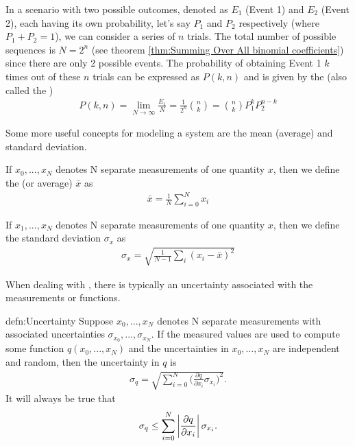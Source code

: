 In a scenario with two possible outcomes, denoted as $E_1$ (Event 1) and $E_2$ (Event 2), each having its own probability, let's say $P_1$ and $P_2$ respectively (where $P_1 + P_2 = 1$), we can consider a series of $n$ trials. The total number of possible sequences is $N=2^n$ (see theorem \ref{thm:Summing Over All binomial coefficients}) since there are only 2 possible events. The probability of obtaining Event 1 $k$ times out of these $n$ trials can be expressed as $P(k, n)$ and is given by the  (also called the )
\begin{align}
P(k,n) = \lim_{N\rightarrow\infty}\frac{E_1}{N} = \frac{1}{2^n}{{n}\choose{k}} = {{n}\choose{k}}P_1^kP_2^{n-k}
\end{align}

Some more useful concepts for modeling a system are the mean (average) and standard deviation. 

\begin{defn}{1}
	If $x_0, ..., x_N$ denotes N separate measurements of one quantity $x$, then we define the  (or average) $\bar{x}$ as
	\begin{align}
		\bar{x} = \frac{1}{N}\sum_{i=0}^{N}x_i \label{mean equation}
	\end{align}
\end{defn}


\begin{defn}{1}
	If $x_1, ..., x_N$ denotes N separate measurements of one quantity $x$, then we define the standard deviation $\sigma_x$ as
	\begin{align}
		\sigma_x = \sqrt{\frac{1}{N-1}\sum_{i}(x_i-\bar{x})^2}
	\end{align}
\end{defn}

When dealing with , there is typically an uncertainty associated with the measurements or functions.

\begin{defn}[Uncertainty]{defn:Uncertainty}
	Suppose $x_0, ..., x_N$ denotes N separate measurements with associated uncertainties $\sigma_{x_0}, ..., \sigma_{x_N}$. If the measured values are used to compute some function $q(x_0, ..., x_N)$ and the uncertainties in $x_0, ..., x_N$ are independent and random, then the uncertainty in $q$ is
	\begin{align}
		\sigma_q = \sqrt{\sum_{i=0}^{N}\bigg(\frac{\partial q}{\partial x_i} \sigma_{x_i}\bigg)^2}.
	\end{align}
 It will always be true that 
 	\begin{align}
		\sigma_q \leq \sum_{i=0}^{N}\left| \frac{\partial q}{\partial x_i} \right| \sigma_{x_i}.
	\end{align}
\end{defn}

